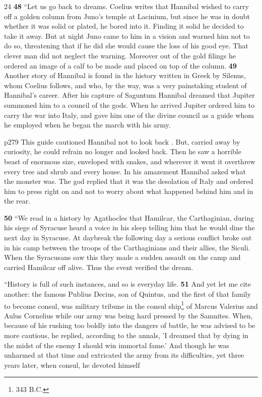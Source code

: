 24
\textbf{48} ``Let us go back to dreams. Coelius writes that Hannibal wished to carry off a golden column from Juno's temple at Lacinium, but since he was in doubt whether it was solid or plated, he bored into it. Finding it solid he decided to take it away. But at night Juno came to him in a vision and warned him not to do so, threatening that if he did she would cause the loss of his good eye. That clever man did not neglect the warning. Moreover out of the gold filings he ordered an image of a calf to be made and placed on top of the column. \textbf{49} Another story of Hannibal is found in the history written in Greek by Silenus, whom Coelius follows, and who, by the way, was a very painstaking student of Hannibal's career. After his capture of Saguntum Hannibal dreamed that Jupiter summoned him to a council of the gods. When he arrived Jupiter ordered him to carry the war into Italy, and gave him one of the divine council as a guide whom he employed when he began the march with his army.

p279 This guide cautioned Hannibal not to look back . But, carried away by curiosity, he could refrain no longer and looked back. Then he saw a horrible beast of enormous size, enveloped with snakes, and wherever it went it overthrew every tree and shrub and every house. In his amazement Hannibal asked what the monster was. The god replied that it was the desolation of Italy and ordered him to press right on and not to worry about what happened behind him and in the rear.

\textbf{50} ``We read in a history by Agathocles that Hamilcar, the Carthaginian, during his siege of Syracuse heard a voice in his sleep telling him that he would dine the next day in Syracuse. At daybreak the following day a serious conflict broke out in his camp between the troops of the Carthaginians and their allies, the Siculi. When the Syracusans saw this they made a sudden assault on the camp and carried Hamilcar off alive. Thus the event verified the dream.

``History is full of such instances, and so is everyday life. \textbf{51} And yet let me cite another: the famous Publius Decius, son of Quintus, and the first of that family to become consul, was military tribune in the consul ­ship\texthebrew{}\footnote{343 B.C.

} of Marcus Valerius and Aulus Cornelius while our army was being hard pressed by the Samnites. When, because of his rushing too boldly into the dangers of battle, he was advised to be more cautious, he replied, according to the annals, 'I dreamed that by dying in the midst of the enemy I should win immortal fame.' And though he was unharmed at that time and extricated the army from its difficulties, yet three years later, when consul, he devoted himself

